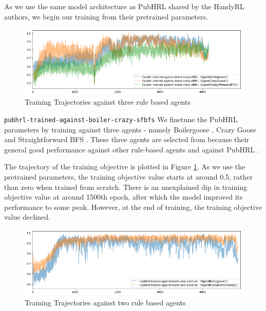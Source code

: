 As we use the same model architecture as PubHRL shared by the HandyRL authors, we begin our training from their pretrained parameters.
\newline

\begin{figure}[h!]
\centering
\includegraphics[width=\textwidth]{images/model-against-boiler-greedy-bfs.png}
\caption{Training Trajectories against three rule based agents}
\label{figure_assorted}
\end{figure}


\verb|pubhrl-trained-against-boiler-crazy-sfbfs|\newline
We finetune the PubHRL parameters by training against three agents - namely 
Boilergoose \cite{notebook_boilergoose}, Crazy Goose \cite{notebook_crazy_goose} and Straightforward BFS \cite{notebook_agents_comparison}. These three agents are selected from because their general good performance against other rule-based agents and against PubHRL \cite{notebook_agents_comparison}. 

The trajectory of the training objective is plotted in Figure \ref{figure_assorted}. As we use the pretrained parameters, the training objective value starts at around 0.5, rather than zero when trained from scratch. There is an unexplained dip in training objective value at around 1500th epoch, after which the model improved its performance to some peak. However, at the end of training, the training objective value declined.

\begin{figure}[h!]
\centering
\includegraphics[width=\textwidth]{images/model-against-greedy-adverse.png}
\caption{Training Trajectories against two rule based agents}
\label{figure_greedy_adverse}
\end{figure}

